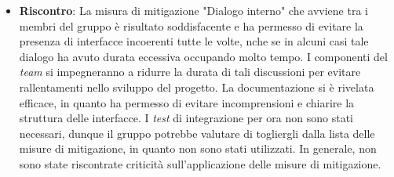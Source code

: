 \begin{itemize}
	\item \textbf{Riscontro}: La misura di mitigazione "Dialogo interno" che avviene tra i membri del gruppo è risultato soddisfacente e ha permesso di evitare la presenza di interfacce incoerenti tutte le volte, 
	nche se in alcuni casi tale dialogo ha avuto durata eccessiva occupando molto tempo. I componenti del \textit{team} si impegneranno a ridurre la durata di tali discussioni per evitare rallentamenti nello sviluppo del progetto.
	La documentazione si è rivelata efficace, in quanto ha permesso di evitare incomprensioni e chiarire la struttura delle interfacce. I \textit{test} di integrazione per ora non sono stati necessari,
	dunque il gruppo potrebbe valutare di togliergli dalla lista delle misure di mitigazione, in quanto non sono stati utilizzati. In generale, non sono state riscontrate criticità sull'applicazione delle misure di mitigazione.
\end{itemize}
